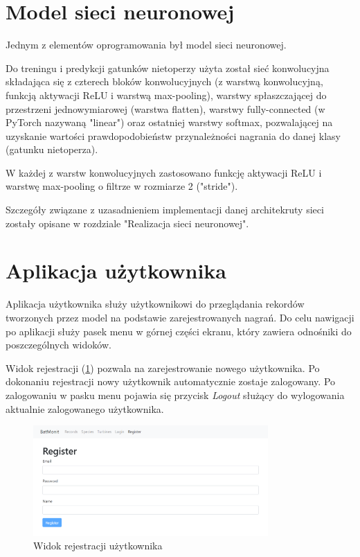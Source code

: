 \documentclass{sprz}
\begin{document}
\section{Model sieci neuronowej}
Jednym z elementów oprogramowania był model sieci neuronowej. 

Do treningu i predykcji gatunków nietoperzy użyta został sieć konwolucyjna składająca się z czterech bloków konwolucyjnych (z warstwą konwolucyjną, funkcją aktywacji ReLU i warstwą max-pooling), warstwy spłaszczającej do przestrzeni jednowymiarowej (warstwa flatten), warstwy fully-connected (w PyTorch nazywaną "linear") oraz ostatniej warstwy softmax, pozwalającej na uzyskanie wartości prawdopodobieństw przynależności nagrania do danej klasy (gatunku nietoperza).

W każdej z warstw konwolucyjnych zastosowano funkcję aktywacji ReLU i warstwę max-pooling o filtrze w rozmiarze 2 ("stride").

Szczegóły związane z uzasadnieniem implementacji danej architekruty sieci zostały opisane w rozdziale "Realizacja sieci neuronowej".
\clearpage

\section{Aplikacja użytkownika}

Aplikacja użytkownika służy użytkownikowi do przeglądania rekordów tworzonych przez model na podstawie zarejestrowanych nagrań. Do celu nawigacji po aplikacji służy pasek menu w górnej części ekranu, który zawiera odnośniki do poszczególnych widoków.

Widok rejestracji (\ref{img:app_register}) pozwala na zarejestrowanie nowego użytkownika. Po dokonaniu rejestracji nowy użytkownik automatycznie zostaje zalogowany. Po zalogowaniu w pasku menu pojawia się przycisk \textit{Logout} służący do wylogowania aktualnie zalogowanego użytkownika.
\begin{figure}[h]
  \centering
  \includegraphics[width=0.8\textwidth]{sprz/app_register}
  \caption{Widok rejestracji użytkownika}
  \label{img:app_register}
\end{figure}
\end{document}
